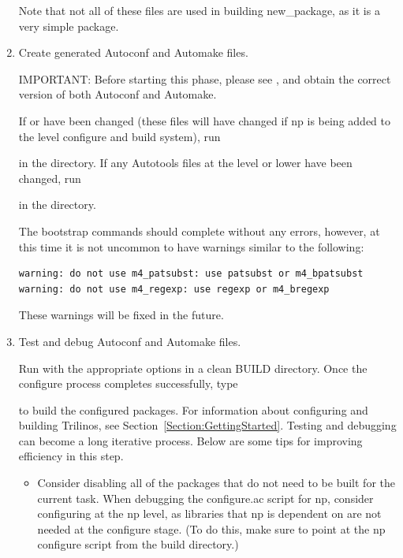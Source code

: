 \documentclass[12pt,strict]{TrilinosDevGuide}
\begin{document}
\begin{enumerate}
Note that not all of these files are used in building new\_package, as it is 
a very simple package.

\item Create generated Autoconf and Automake files.

IMPORTANT: Before starting this phase, please see \newline
{}, and obtain the correct 
version of both Autoconf and Automake.

If  or 
 have been changed (these files 
will have changed if np is being added to the  level 
configure and build system), run 


in the  directory.  If any Autotools files at the 
 level or lower have been changed, run 


in the  directory.

The bootstrap commands should complete without any errors, however, at this
time it is not uncommon to have warnings similar to the following:
\begin{verbatim}
warning: do not use m4_patsubst: use patsubst or m4_bpatsubst
warning: do not use m4_regexp: use regexp or m4_bregexp
\end{verbatim}
These warnings will be fixed in the future.

\item Test and debug Autoconf and Automake files.

Run  with the appropriate options in a clean BUILD 
directory.  Once the configure process completes successfully, type 


to build the configured packages.  For information about configuring and 
building Trilinos, see Section~\ref{Section:GettingStarted}.  Testing and 
debugging can become a long iterative process.  Below are some tips for 
improving efficiency in this step.  

\begin{itemize}

\item Consider disabling all of the packages that do not need to be built for 
the current task.  When debugging the configure.ac script for np, consider 
configuring at the np level, as libraries that np is dependent on are not 
needed at the configure stage.  (To do this, make sure to point at the np 
configure script from the build directory.)


\end{itemize}
\end{enumerate}
\end{document}
